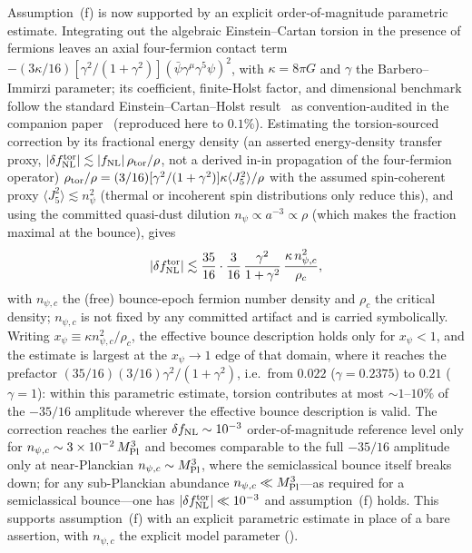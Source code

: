 \documentclass[aps,prd,twocolumn,superscriptaddress,showpacs,preprintnumbers,nofootinbib,longbibliography,floatfix]{revtex4-2}
\newcommand{\fnl}{f_{\rm NL}}
\begin{document}
Assumption~(f) is now supported by an explicit order-of-magnitude parametric estimate. Integrating out the algebraic Einstein--Cartan torsion in the presence of fermions leaves an axial four-fermion contact term $-(3\kappa/16)[\gamma^2/(1+\gamma^2)](\bar\psi\gamma^\mu\gamma^5\psi)^2$, with $\kappa=8\pi G$ and $\gamma$ the Barbero--Immirzi parameter; its coefficient, finite-Holst factor, and dimensional benchmark follow the standard Einstein--Cartan--Holst result~\cite{Freidel2005} as convention-audited in the companion paper~\cite{Golden2026P1a} (reproduced here to $0.1\%$). Estimating the torsion-sourced correction by its fractional energy density (an asserted energy-density transfer proxy, $|\delta\fnl^{\rm tor}|\lesssim|\fnl|\,\rho_{\rm tor}/\rho$, not a derived in-in propagation of the four-fermion operator) $\rho_{\rm tor}/\rho=(3/16)[\gamma^2/(1+\gamma^2)]\kappa\langle J_5^2\rangle/\rho$ with the assumed spin-coherent proxy $\langle J_5^2\rangle\lesssim n_\psi^2$ (thermal or incoherent spin distributions only reduce this), and using the committed quasi-dust dilution $n_\psi\propto a^{-3}\propto\rho$ (which makes the fraction maximal at the bounce), gives
\begin{equation}
\label{eq:torsionbound}
|\delta\fnl^{\rm tor}| \lesssim \frac{35}{16}\cdot\frac{3}{16}\,\frac{\gamma^2}{1+\gamma^2}\,\frac{\kappa\,n_{\psi,c}^2}{\rho_c},
\end{equation}
with $n_{\psi,c}$ the (free) bounce-epoch fermion number density and $\rho_c$ the critical density; $n_{\psi,c}$ is not fixed by any committed artifact and is carried symbolically. Writing $x_\psi\equiv\kappa n_{\psi,c}^2/\rho_c$, the effective bounce description holds only for $x_\psi<1$, and the estimate is largest at the $x_\psi\to1$ edge of that domain, where it reaches the prefactor $(35/16)(3/16)\gamma^2/(1+\gamma^2)$, i.e.\ from $0.022$ ($\gamma=0.2375$) to $0.21$ ($\gamma=1$): within this parametric estimate, torsion contributes at most $\sim1$--$10\%$ of the $-35/16$ amplitude wherever the effective bounce description is valid. The correction reaches the earlier $\delta\fnl\sim10^{-3}$ order-of-magnitude reference level only for $n_{\psi,c}\sim3\times10^{-2}\,M_{\rm Pl}^3$ and becomes comparable to the full $-35/16$ amplitude only at near-Planckian $n_{\psi,c}\sim M_{\rm Pl}^3$, where the semiclassical bounce itself breaks down; for any sub-Planckian abundance $n_{\psi,c}\ll M_{\rm Pl}^3$---as required for a semiclassical bounce---one has $|\delta\fnl^{\rm tor}|\ll10^{-3}$ and assumption~(f) holds. This supports assumption~(f) with an explicit parametric estimate in place of a bare assertion, with $n_{\psi,c}$ the explicit model parameter ().
\end{document}
